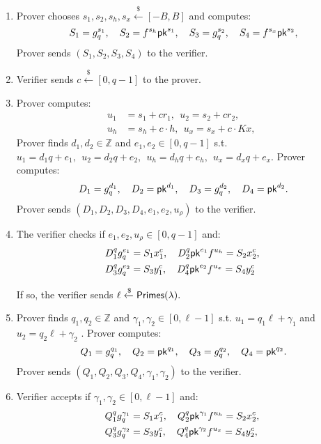 \documentclass[runningheads]{llncs}
\newcommand{\pk}{{\sf pk}}
\begin{document}
\begin{enumerate}
	
	\item		Prover chooses %
	$s_1, s_2, s_h, s_x \xleftarrow{\$}  [-B, B]$  and computes:
	\[
 S_1 =g_q^{s_1}, \quad S_2= f^{s_h} \pk^ {s_1}, \quad S_3 = g_q^{s_2}, \quad S_4= f^{s_x} \pk^ {s_2},
	\]
	Prover sends $( S_1, S_2, S_3,S_4)$ to the verifier.\\
	
	\item	Verifier sends $c \xleftarrow{\$}  [0,  q-1]$ to the prover.\\
	
	\item	Prover computes:
	\begin{align*}
	u_1 &= s_1 + c r_1, ~~ u_2 = s_2 + c r_2, \\
	u_{h} &= s_{h} + c\cdot h,~~
	u_{x} = s_{x} + c\cdot Kx,~~
	\end{align*}
	Prover finds $d_1,d_2 \in \mathbb{Z}$ and $e_1,e_2\in [0, q-1]$ s.t. 
	$u_1 = d_1 q + e_1,~~u_2 = d_2 q + e_2,~~u_h = d_h q + e_h,~~u_x = d_x q + e_x$.
	Prover computes:
	\[
	D_1 = g_q^{d_1},  \quad D_2 = \pk^{d_1},  \quad D_3 = g_q^{d_2},\quad D_4 = \pk^{d_2}.
	\] 
	Prover sends $(D_1, D_2, D_3,D_4,e_1,e_2, u_\rho)$ to the verifier.\\
	
	\item	The verifier checks if $e_1,e_2,u_\rho \in [0, q-1]$ and:
	\begin{align*}
	D_1^q g_q^{e_1} &= S_1 x_1^c, \quad D_2^q \pk^{e_1} f^{u_h} = S_2 x_2^c, \ \\
	D_3^q g_q^{e_2} &= S_3 y_1^c, \quad 	D_4^q \pk^{e_2} f^{u_x} = S_4 y_2^c 
	\end{align*}
	
	
	If so, the verifier sends $\ell \xleftarrow{\$} {\sf Primes}(\lambda).$\\
	
	
	\item	Prover finds $q_1,q_2 \in \mathbb{Z}$ and $\gamma_1,\gamma_2\in [0, \ell-1]$ s.t. 
	$u_1 = q_1\ell + \gamma_1$ and $u_2 = q_2\ell + \gamma_2$ .
	Prover computes:
	\[
	Q_1 = g_q^{q_1},\quad Q_2 = \pk^{q_1},  \quad Q_3 = g_q^{q_2}, \quad Q_4 = \pk^{q_2}.
	\] 
	Prover sends $(Q_1, Q_2, Q_3,Q_4 , \gamma_1, \gamma_2)$ to the verifier.
	
	
	\item	Verifier accepts if $\gamma_1, \gamma_2 \in [0, \ell-1]$ and:
	\begin{align*}
	Q_1^q g_q^{\gamma_1} &= S_1 x_1^c, 
	\quad Q_2^q \pk^{\gamma_1} f^{u_h} = S_2 x_2^c, \ \\
	Q_3^q g_q^{\gamma_2} &= S_3 y_1^c, 
	\quad Q_4^q \pk^{\gamma_2} f^{u_x} = S_4 y_2^c ,
	\end{align*}
	
\end{enumerate}
\end{document}
